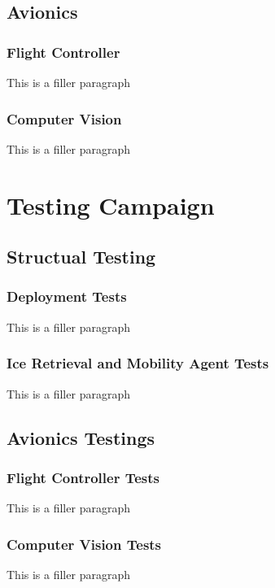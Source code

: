 	\subsection{Avionics}
		\subsubsection{Flight Controller}
			This is a filler paragraph

		\subsubsection{Computer Vision}
			This is a filler paragraph

\section{Testing Campaign}\label{PL:Deployment:Testing}
	\subsection{Structual Testing}
		\subsubsection{Deployment Tests}
			This is a filler paragraph

		\subsubsection{Ice Retrieval and Mobility Agent Tests}
			This is a filler paragraph

	\subsection{Avionics Testings}
		\subsubsection{Flight Controller Tests}
			This is a filler paragraph

		\subsubsection{Computer Vision Tests}
			This is a filler paragraph





